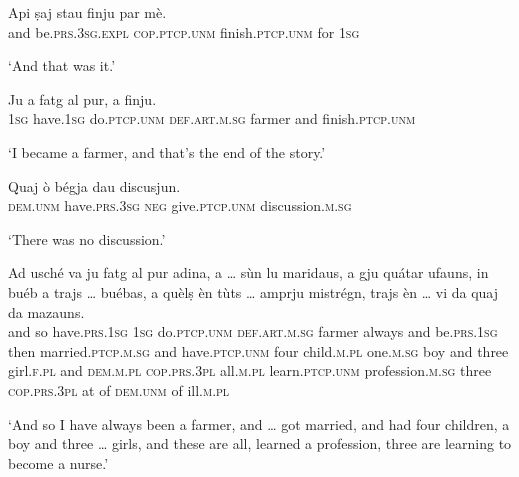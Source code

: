 \begin{linenumbers}
\gll    Api ṣaj stau finju par mè.\\
and be.\textsc{prs.3sg.expl} \textsc{cop.ptcp.unm} finish.\textsc{ptcp.unm} for \textsc{1sg}\\
\end{linenumbers}
\medskip
\glt `And that was it.'
\medskip

\begin{linenumbers}
\gll    Ju a fatg al pur, a finju.\\
 \textsc{1sg} have.\textsc{1sg} do.\textsc{ptcp.unm} \textsc{def.art.m.sg} farmer and finish.\textsc{ptcp.unm}  \\
\end{linenumbers}
\medskip
\glt `I became a farmer, and that’s the end of the story.'
\medskip

\begin{linenumbers}
\gll    Quaj ò bégja dau discusjun.\\
 \textsc{dem.unm} have.\textsc{prs.3sg} \textsc{neg} give.\textsc{ptcp.unm} discussion.\textsc{m.sg}\\
\end{linenumbers}
\medskip
\glt `There was no discussion.'
\medskip

\begin{linenumbers}
\gll    Ad usché va ju fatg al pur adina, a … sùn lu maridaus, a gju quátar ufauns, in buéb a trajs … buébas, a quèlṣ èn tùts … amprju mistrégn, trajs èn … vi da quaj da mazauns.\\
and so have.\textsc{prs.1sg} \textsc{1sg} do.\textsc{ptcp.unm} \textsc{def.art.m.sg} farmer always and {} be.\textsc{prs.1sg} then married.\textsc{ptcp.m.sg} and have.\textsc{ptcp.unm} four  child.\textsc{m.pl} one.\textsc{m.sg} boy and three {} girl.\textsc{f.pl} and \textsc{dem.m.pl} \textsc{cop.prs.3pl} all.\textsc{m.pl} {} learn.\textsc{ptcp.unm} profession.\textsc{m.sg} three \textsc{cop.prs.3pl} {} at of \textsc{dem.unm} of ill.\textsc{m.pl}\\
\end{linenumbers}
\medskip 
\glt `And so I have always been a farmer, and … got married, and had four children, a boy and three … girls, and these are all, learned a profession, three are learning to become a nurse.'
\medskip

